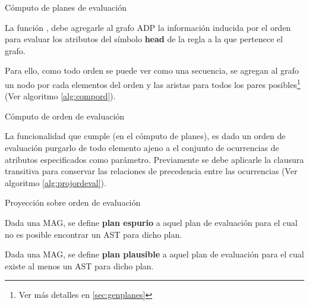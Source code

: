 \begin{algorithm}[!ht]

\caption{\label{alg:planeval} Cómputo de planes de evaluación}
\end{algorithm}

La función , debe agregarle al grafo ADP la información inducida por el orden para evaluar los atributos del símbolo \textbf{head} de la regla a la que pertenece el grafo.

Para ello, como todo orden se puede ver como una secuencia, se agregan al grafo un nodo por cada elementos del orden y las aristas para todos los pares posibles\footnote{Ver más detalles en \ref{sec:genplanes}} (Ver algoritmo \ref{alg:compord}).

\begin{algorithm}[!ht]

\caption{\label{alg:compord}Cómputo de orden de evaluación}
\end{algorithm}

La funcionalidad que cumple  (en el cómputo de planes), es dado un orden de evaluación purgarlo de todo elemento ajeno a el conjunto de ocurrencias de atributos especificados como parámetro. Previamente se debe aplicarle la clausura transitiva para conservar las relaciones de precedencia entre las ocurrencias (Ver algoritmo \ref{alg:projordeval}).

\begin{algorithm}[!ht]

\caption{\label{alg:projordeval} Proyección sobre orden de evaluación}
\end{algorithm}



\begin{definition}
\label{def:plan_espurios}
Dada una MAG, se define \textbf{plan espurio} a aquel plan de evaluación para el cual no es posible encontrar un AST para dicho plan.
\end{definition}

\begin{definition}
\label{def:plan_plausible}
Dada una MAG, se define \textbf{plan plausible} a aquel plan de evaluación para el cual existe al menos un AST para dicho plan.
\end{definition}


